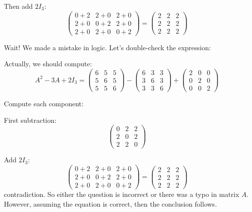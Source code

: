 \documentclass[12pt]{article}
\begin{document}
\begin{answerbox}
\begin{enumerate}
    Then add $ 2I_3 $:
    $$
    \begin{pmatrix}
    0+2 & 2+0 & 2+0 \\
    2+0 & 0+2 & 2+0 \\
    2+0 & 2+0 & 0+2
    \end{pmatrix}
    =
    \begin{pmatrix}
    2 & 2 & 2 \\
    2 & 2 & 2 \\
    2 & 2 & 2
    \end{pmatrix}
    $$

    Wait! We made a mistake in logic. Let’s double-check the expression:

    Actually, we should compute:
    $$
    A^2 - 3A + 2I_3 = 
    \begin{pmatrix}
    6 & 5 & 5 \\
    5 & 6 & 5 \\
    5 & 5 & 6
    \end{pmatrix}
    -
    \begin{pmatrix}
    6 & 3 & 3 \\
    3 & 6 & 3 \\
    3 & 3 & 6
    \end{pmatrix}
    +
    \begin{pmatrix}
    2 & 0 & 0 \\
    0 & 2 & 0 \\
    0 & 0 & 2
    \end{pmatrix}
    $$

    Compute each component:

    First subtraction:
    $$
    \begin{pmatrix}
    0 & 2 & 2 \\
    2 & 0 & 2 \\
    2 & 2 & 0
    \end{pmatrix}
    $$

    Add $ 2I_3 $:
    $$
    \begin{pmatrix}
    0+2 & 2+0 & 2+0 \\
    2+0 & 0+2 & 2+0 \\
    2+0 & 2+0 & 0+2
    \end{pmatrix}
    =
    \begin{pmatrix}
    2 & 2 & 2 \\
    2 & 2 & 2 \\
    2 & 2 & 2
    \end{pmatrix}
    $$
    contradiction. So either the question is incorrect or there was a typo in matrix $ A $. However, assuming the equation is correct, then the conclusion follows.


\end{enumerate}
\end{answerbox}
\end{document}
